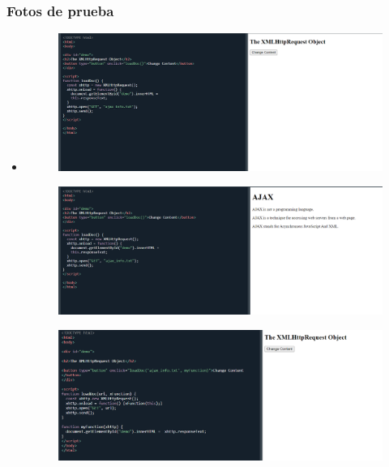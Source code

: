 \documentclass{article}
\begin{document}
	\subsubsection{Fotos de prueba}
	\begin{itemize}
		\item \begin{figure}[H]
			\centering
			\includegraphics[width=1.0\textwidth,keepaspectratio]{img/F1.png}
		\end{figure}

		\begin{figure}[H]
			\centering
			\includegraphics[width=1.0\textwidth,keepaspectratio]{img/F2.png}
		\end{figure}

		\begin{figure}[H]
			\centering
			\includegraphics[width=1.0\textwidth,keepaspectratio]{img/F3.png}
		\end{figure}


\end{itemize}
\end{document}
